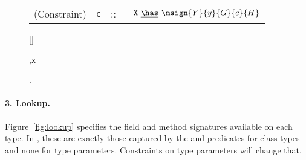 \begin{figure*}
\begin{minipage}{.45\textwidth}
\centering
\begin{tabular}{r@{\quad}rcl}
  (Constraint) & {\tt c} &{::=}& ${\tt X}~\underline{\has}~\msign{Y}{y}{G}{c}{H}$
\end{tabular}

\end{minipage}%
\begin{minipage}{.55\textwidth}
\vspace{-\bigskipamount}
\quad{}
  {[]~\underline\has~}
\end{minipage}%

\begin{minipage}{\textwidth}
\quad{}
	{}

  {\Gamma,{\tt x}~\has~}

	{\Gamma\vdash\false}
\end{minipage}%
\caption{.}
\label{fig:FXGS}
\end{figure*}


\paragraph{3. Lookup.} Figure~\ref{fig:lookup} specifies the field and method signatures available on each type. In \FXGL{\cdot}, these are exactly those captured by the \fields{} and \methods{} predicates for class types and none for type parameters. Constraints on type parameters will change that.

